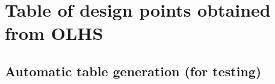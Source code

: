 \appendix
\chapter{Table of design points obtained from OLHS}

\section{Automatic table generation (for testing)}

{\small 
	}
